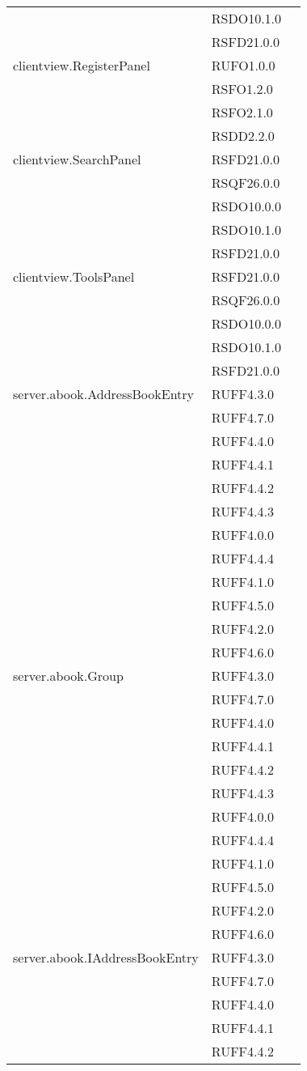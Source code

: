 \begin{center}
\begin{longtable}{lp{}l}
& RSDO10.1.0\\
& RSFD21.0.0\\
clientview.RegisterPanel & RUFO1.0.0\\
& RSFO1.2.0\\
& RSFO2.1.0\\
& RSDD2.2.0\\
clientview.SearchPanel & RSFD21.0.0\\
& RSQF26.0.0\\
& RSDO10.0.0\\
& RSDO10.1.0\\
& RSFD21.0.0\\
clientview.ToolsPanel & RSFD21.0.0\\
& RSQF26.0.0\\
& RSDO10.0.0\\
& RSDO10.1.0\\
& RSFD21.0.0\\
server.abook.AddressBookEntry & RUFF4.3.0 \\
 & RUFF4.7.0 \\
 & RUFF4.4.0 \\
 & RUFF4.4.1 \\
 & RUFF4.4.2 \\
 & RUFF4.4.3 \\
 & RUFF4.0.0 \\
 & RUFF4.4.4 \\
 & RUFF4.1.0 \\
 & RUFF4.5.0 \\
 & RUFF4.2.0 \\
 & RUFF4.6.0 \\
server.abook.Group & RUFF4.3.0 \\
 & RUFF4.7.0 \\
 & RUFF4.4.0 \\
 & RUFF4.4.1 \\
 & RUFF4.4.2 \\
 & RUFF4.4.3 \\
 & RUFF4.0.0 \\
 & RUFF4.4.4 \\
 & RUFF4.1.0 \\
 & RUFF4.5.0 \\
 & RUFF4.2.0 \\
 & RUFF4.6.0 \\
server.abook.IAddressBookEntry & RUFF4.3.0 \\
 & RUFF4.7.0 \\
 & RUFF4.4.0 \\
 & RUFF4.4.1 \\
 & RUFF4.4.2 \\

\end{longtable}
\end{center}
